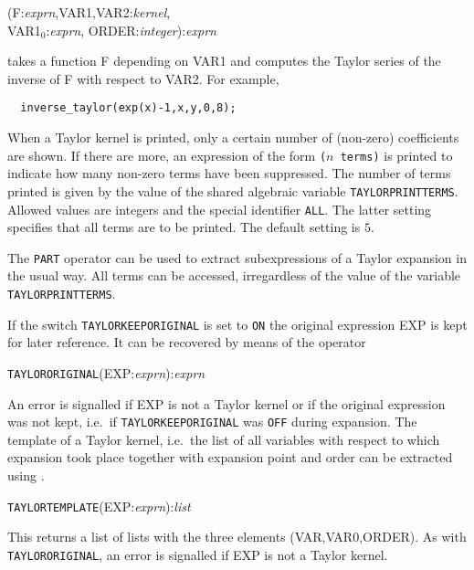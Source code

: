 (F:{\em exprn},VAR1,VAR2:{\em kernel},\\
VAR1$_0$:{\em exprn},
                                 ORDER:{\em integer}):{\em exprn}

takes a function F depending on VAR1 and computes the Taylor series of
the inverse of F with respect to VAR2. For example,

\begin{verbatim}
  inverse_taylor(exp(x)-1,x,y,0,8);
\end{verbatim}


When a Taylor kernel is printed, only a certain number of (non-zero)
coefficients are shown. If there are more, an expression of the form
\verb|(|$n$\verb| terms)| is printed to indicate how many non-zero
terms have been suppressed. The number of terms printed is given by
the value of the shared algebraic variable \verb|TAYLORPRINTTERMS|.
Allowed values are integers and the special identifier \verb|ALL|. The
latter setting specifies that all terms are to be printed. The default
setting is $5$.

The \verb|PART| operator can be used to extract subexpressions of a
Taylor expansion in the usual way. All terms can be accessed,
irregardless of the value of the variable \verb|TAYLORPRINTTERMS|.


If the switch \verb|TAYLORKEEPORIGINAL| is set to \verb|ON| the
original expression EXP is kept for later reference.
It can be recovered by means of the operator

\hspace*{2em} {\tt TAYLORORIGINAL}(EXP:{\em exprn}):{\em exprn}

An error is signalled if EXP is not a Taylor kernel or if the original
expression was not kept, i.e.\ if \verb|TAYLORKEEPORIGINAL| was
\verb|OFF| during expansion.  The template of a Taylor kernel, i.e.\
the list of all variables with respect to which expansion took place
together with expansion point and order can be extracted using
.

\hspace*{2em} {\tt TAYLORTEMPLATE}(EXP:{\em exprn}):{\em list}

This returns a list of lists with the three elements (VAR,VAR0,ORDER).
As with \verb|TAYLORORIGINAL|,
an error is signalled if EXP is not a Taylor kernel.


